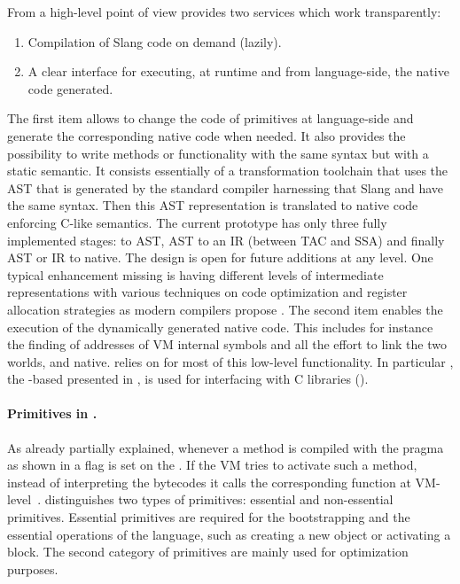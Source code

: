 From a high-level point of view \WF provides two services which work transparently: 
%
\begin{enumerate}
	\item Compilation of Slang code on demand (lazily).
	\item A clear interface for executing, at runtime and from language-side, the native code generated.
\end{enumerate}
%
The first item allows to change the code of primitives at language-side and generate the corresponding native code when needed. 
It also provides the possibility to write methods or functionality with the same \ST syntax but with a static semantic. 
It consists essentially of a transformation toolchain that uses the AST that is generated by the standard \PH compiler harnessing that Slang and \ST have the same syntax. 
Then this AST representation is translated to native code enforcing C-like \Slang semantics. The current prototype has only three fully implemented stages: \Slang to AST, AST to an IR (between TAC and SSA) and finally AST or IR to native.
The design is open for future additions at any level.
One typical enhancement missing is having different levels of intermediate representations with various techniques on code optimization and register allocation strategies as modern compilers propose \cite[Ch.\ 1]{Appe98a}. 
The second item enables the execution of the dynamically generated native code.
This includes for instance the finding of addresses of VM internal symbols and all the effort to link the two worlds, \ST and native.
\WF relies on \B for most of this low-level functionality.
In particular \NB, the \B-based \FFI presented in , is used for interfacing with C libraries (). 

\paragraph{Primitives in \ST.}
As already partially explained, whenever a method is compiled with the  pragma as shown in  a flag is set on the . 
If the VM tries to activate such a method, instead of interpreting the bytecodes it calls the corresponding function at VM-level~\cite{Gold83a}.
\ST distinguishes two types of primitives: essential and non-essential primitives.
Essential primitives are required for the bootstrapping and the essential operations of the language, such as creating a new object or activating a block.
The second category of primitives are mainly used for optimization purposes.

